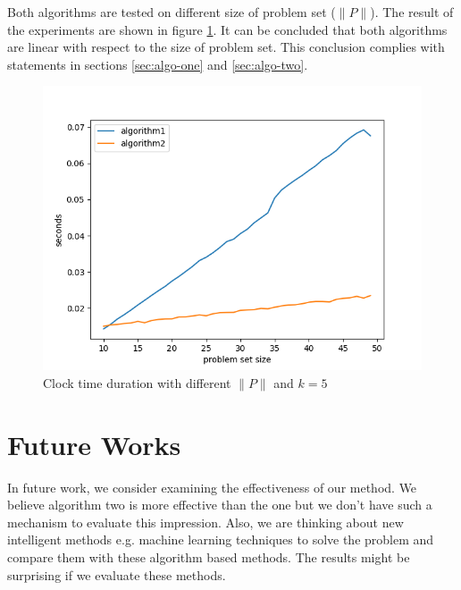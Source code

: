 \documentclass{template}
\begin{document}
Both algorithms are tested on different size of problem set (\(\lVert P \rVert\)). The result
of the experiments are shown in figure \ref{fig:p-comparison}. It can be concluded that both 
algorithms are linear with respect to the size of problem set. This conclusion complies with
statements in sections \ref{sec:algo-one} and \ref{sec:algo-two}.

\begin{figure}
    \includegraphics[width=\linewidth]{./images/algo1_algo2_diff_p.png}
    \caption{Clock time duration with different \(\lVert P \rVert\) and \(k=5\)}
    \label{fig:p-comparison}
\end{figure}


\section{Future Works}
\label{sec:f-work}
In future work, we consider examining the effectiveness of our method. We believe algorithm 
two is more effective than the one but we don't have such a mechanism to evaluate this 
impression. Also, we are thinking about new intelligent methods e.g. machine learning 
techniques to solve the problem and compare them with these algorithm based methods. 
The results might be surprising if we evaluate these methods.
\end{document}

